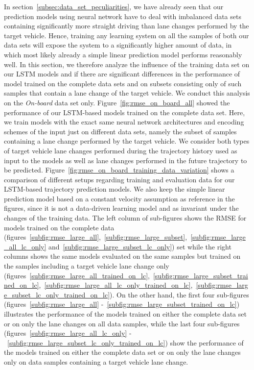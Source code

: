 In section~\ref{subsec:data_set_peculiarities}, we have already seen that our prediction models using neural network have to deal with imbalanced data sets containing significantly more straight driving than lane changes performed by the target vehicle.
Hence, training any learning system on all the samples of both our data sets will expose the system to a significantly higher amount of data, in which most likely already a simple linear prediction model performs reasonably well. 
In this section, we therefore analyze the influence of the training data set on our \ac{LSTM} models and if there are significant differences in the performance of model trained on the complete data sets and on subsets consisting only of such samples that contain a lane change of the target vehicle.
We conduct this analysis on the \emph{On-board} data set only.
Figure~\ref{fig:rmse_on_board_all} showed the performance of our \ac{LSTM}-based models trained on the complete data set.
Here, we train models with the exact same neural network architectures and encoding schemes of the input just on different data sets, namely the subset of samples containing a lane change performed by the target vehicle.
We consider both types of target vehicle lane changes performed during the trajectory history used as input to the models as well as lane changes performed in the future trajectory to be predicted.
Figure~\ref{fig:rmse_on_board_training_data_variation} shows a comparison of different setups regarding training and evaluation data for our \ac{LSTM}-based trajectory prediction models.
We also keep the simple linear prediction model based on a constant velocity assumption as reference in the figures, since it is not a data-driven learning model and as invariant under the changes of the training data.
The left column of sub-figures shows the \ac{RMSE} for models trained on the complete data (figures~\ref{subfig:rmse_large_all},~\ref{subfig:rmse_large_subset},~\ref{subfig:rmse_large_all_lc_only} and~\ref{subfig:rmse_large_subset_lc_only}) set while the right columns shows the same models evaluated on the same samples but trained on the samples including a target vehicle lane change only (figures~\ref{subfig:rmse_large_all_trained_on_lc},~\ref{subfig:rmse_large_subset_trained_on_lc},~\ref{subfig:rmse_large_all_lc_only_trained_on_lc},~\ref{subfig:rmse_large_subset_lc_only_trained_on_lc}).
On the other hand, the first four sub-figures (figures~\ref{subfig:rmse_large_all} -~\ref{subfig:rmse_large_subset_trained_on_lc}) illustrates the performance of the models trained on either the complete data set or on only the lane changes on all data samples, while the last four sub-figures (figures~\ref{subfig:rmse_large_all_lc_only} -~\ref{subfig:rmse_large_subset_lc_only_trained_on_lc}) show the performance of the models trained on either the complete data set or on only the lane changes only on data samples containing a target vehicle lane change.

